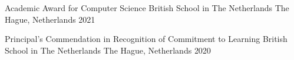 



\begin{cvhonors}

  \cvhonor
    {Academic Award for Computer Science} %
    {British School in The Netherlands} %
    {The Hague, Netherlands} %
    {2021} %

  \cvhonor
    {Principal's Commendation in Recognition of Commitment to Learning} %
    {British School in The Netherlands} %
    {The Hague, Netherlands} %
    {2020} %

\end{cvhonors}








